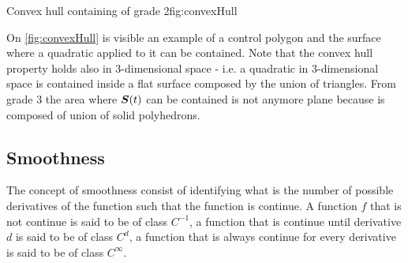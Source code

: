 \documentclass[dissertation.tex]{subfiles}
\begin{document}
\begin{myfig}{Convex hull containing \bs of grade 2}{fig:convexHull}
\end{myfig}
On \cref{fig:convexHull} is visible an example of a control polygon
and the surface where a quadratic \bs applied to
it can be contained. Note that the convex hull property holds also in
3-dimensional
space - i.e. a quadratic \bs in 3-dimensional space is contained
inside a flat surface composed by the union of triangles. From grade 3
the area where $\boldsymbol{S}(t)$ can be contained is not anymore plane
because is composed of union of solid polyhedrons.

\subsection{Smoothness}\label{sec:smoothness}
The concept of smoothness consist of identifying what is the number of
possible derivatives of the function such that the function is
continue. A function $f$ that is not continue is said to be of class
$C^{-1}$, a function that is continue until derivative $d$ is said to
be of class $C^d$, a function that is always continue for every
derivative is said to be of class $C^\infty$.
\end{document}
